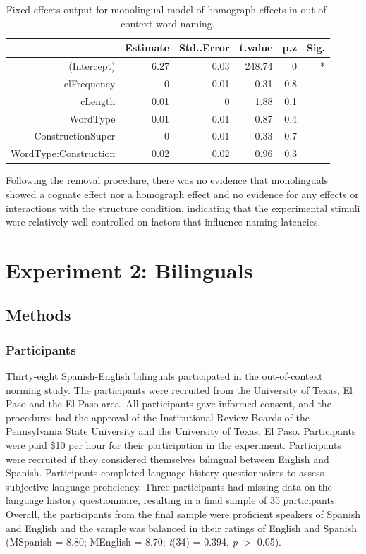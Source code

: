 \begin{table}[htbp]
  \centering
  \caption{Fixed-effects output for monolingual model of homograph effects in out-of-context word naming.}
    \begin{tabular}{rrrrrr}
    \toprule
          & Estimate & Std..Error & t.value & p.z   & Sig. \\
    \midrule
    (Intercept) & 6.27  & 0.03  & 248.74 & 0     & * \\
    clFrequency & 0     & 0.01  & 0.31  & 0.8   &  \\
    cLength & 0.01  & 0     & 1.88  & 0.1   &  \\
    WordType & 0.01  & 0.01  & 0.87  & 0.4   &  \\
    ConstructionSuper & 0     & 0.01  & 0.33  & 0.7   &  \\
    WordType:Construction & 0.02  & 0.02  & 0.96  & 0.3   &  \\
    \bottomrule
    \end{tabular}%
  \label{tab:ooc.mon.hom.rem}%
\end{table}%

Following the removal procedure, there was no evidence that monolinguals showed a cognate effect nor a homograph effect and no evidence for any effects or interactions with the structure condition, indicating that the experimental stimuli were relatively well controlled on factors that influence naming latencies.

\section{Experiment 2: Bilinguals}
\label{experiment2:bilinguals}

\subsection{Methods}
\label{methods}

\subsubsection{Participants}
\label{participants}

Thirty-eight Spanish-English bilinguals participated in the out-of-context norming study. The participants were recruited from the University of Texas, El Paso and the El Paso area. All participants gave informed consent, and the procedures had the approval of the Institutional Review Boards of the Pennsylvania State University and the University of Texas, El Paso. Participants were paid \$10 per hour for their participation in the experiment. Participants were recruited if they considered themselves bilingual between English and Spanish. Participants completed language history questionnaires to assess subjective language proficiency. Three participants had missing data on the language history questionnaire, resulting in a final sample of 35 participants. Overall, the participants from the final sample were proficient speakers of Spanish and English and the sample was balanced in their ratings of English and Spanish (MSpanish = 8.80; MEnglish = 8.70; \emph{t}(34) = 0.394, \emph{p} $>$ 0.05).

